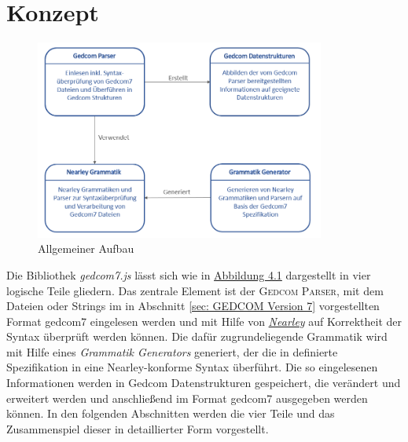 \chapter{Konzept}
\label{chap: Konzept}

\begin{figure}[b]
	\centering
	\includegraphics[width=0.85\textwidth]{images/konzept_allgemein.png}
	\caption{Allgemeiner Aufbau}
	\label{fig: Allgemeiner Aufbau}
\end{figure}

Die Bibliothek \textit{gedcom7.js} lässt sich wie in \hyperref[fig: Allgemeiner Aufbau]{Abbildung 4.1} dargestellt in vier logische Teile gliedern. Das zentrale Element ist der \textsc{Gedcom Parser}, mit dem Dateien oder Strings im in Abschnitt \ref{sec: GEDCOM Version 7} vorgestellten Format gedcom7 eingelesen werden und mit Hilfe von \hyperref[sec: Nearley]{\textit{Nearley}} auf Korrektheit der Syntax überprüft werden können. Die dafür zugrundeliegende Grammatik wird mit Hilfe eines \textit{Grammatik Generators} generiert, der die in \cite{GEDCOM} definierte Spezifikation in eine Nearley-konforme Syntax überführt. Die so eingelesenen Informationen werden in Gedcom Datenstrukturen gespeichert, die verändert und erweitert werden und anschließend im Format gedcom7 ausgegeben werden können. In den folgenden Abschnitten werden die vier Teile und das Zusammenspiel dieser in detaillierter Form vorgestellt.


